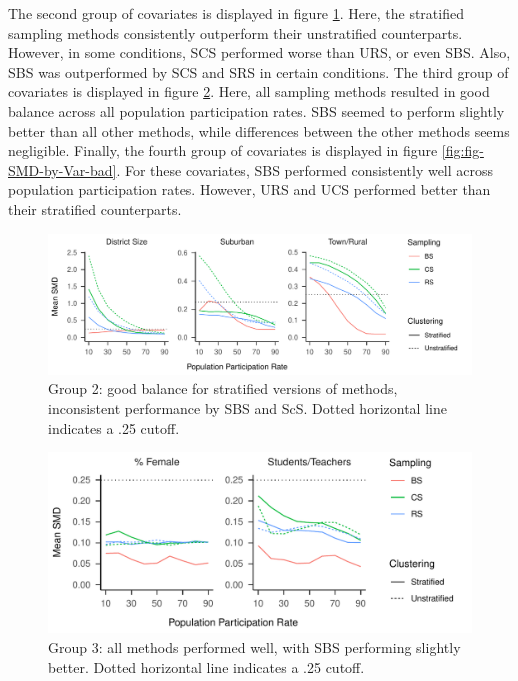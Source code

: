 \documentclass[
  english,
  man,floatsintext]{apa6}
\begin{document}
The second group of covariates is displayed in figure \ref{fig:fig-SMD-by-Var-good2}. Here, the stratified sampling methods consistently outperform their unstratified counterparts. However, in some conditions, SCS performed worse than URS, or even SBS. Also, SBS was outperformed by SCS and SRS in certain conditions. The third group of covariates is displayed in figure \ref{fig:fig-SMD-by-Var-neutral}. Here, all sampling methods resulted in good balance across all population participation rates. SBS seemed to perform slightly better than all other methods, while differences between the other methods seems negligible. Finally, the fourth group of covariates is displayed in figure \ref{fig:fig-SMD-by-Var-bad}. For these covariates, SBS performed consistently well across population participation rates. However, URS and UCS performed better than their stratified counterparts.

\begin{figure}
\centering
\includegraphics{GenSamp-Paper_files/figure-latex/fig-SMD-by-Var-good2-1.pdf}
\caption{\label{fig:fig-SMD-by-Var-good2}Group 2: good balance for stratified versions of methods, inconsistent performance by SBS and ScS. Dotted horizontal line indicates a .25 cutoff.}
\end{figure}

\begin{figure}
\centering
\includegraphics{GenSamp-Paper_files/figure-latex/fig-SMD-by-Var-neutral-1.pdf}
\caption{\label{fig:fig-SMD-by-Var-neutral}Group 3: all methods performed well, with SBS performing slightly better. Dotted horizontal line indicates a .25 cutoff.}
\end{figure}
\end{document}
